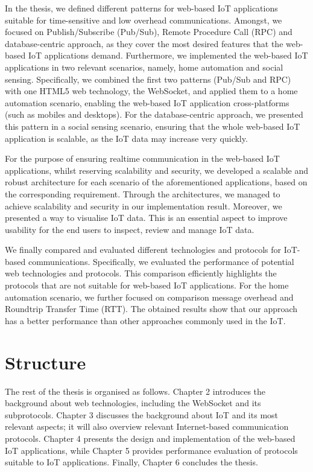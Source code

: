 In the thesis, we defined different patterns for web-based IoT applications suitable for time-sensitive and low overhead communications. Amongst, we focused on Publish/Subscribe (Pub/Sub), Remote Procedure Call (RPC) and database-centric approach, as they cover the most desired features that the web-based IoT applications demand. Furthermore, we implemented the web-based IoT applications in two relevant scenarios, namely, home automation and social sensing. Specifically, we combined the first two patterns (Pub/Sub and RPC) with one HTML5 web technology, the WebSocket, and applied them to a home automation scenario, enabling the web-based IoT application cross-platforms (such as mobiles and desktops). For the database-centric approach, we presented this pattern in a social sensing scenario, ensuring that the whole web-based IoT application is scalable, as the IoT data may increase very quickly.

For the purpose of ensuring realtime communication in the web-based IoT applications, whilst reserving scalability and security, we developed a scalable and robust architecture for each scenario of the aforementioned applications, based on the corresponding requirement. Through the architectures, we managed to achieve scalability and security in our implementation result. Moreover, we presented a way to visualise IoT data. This is an essential aspect to improve usability for the end users to inspect, review and manage IoT data.

We finally compared and evaluated different technologies and protocols for IoT-based communications. Specifically, we evaluated the performance of potential web technologies and protocols. This comparison efficiently highlights the protocols that are not suitable for web-based IoT applications. For the home automation scenario, we further focused on comparison message overhead and Roundtrip Transfer Time (RTT). The obtained results show that our approach has a better performance than other approaches commonly used in the IoT.

\section{Structure}

The rest of the thesis is organised as follows. Chapter 2 introduces the background about web technologies, including the WebSocket and its subprotocols. Chapter 3 discusses the background about IoT and its most relevant aspects; it will also overview relevant Internet-based communication protocols. Chapter 4 presents the design and implementation of the web-based IoT applications, while Chapter 5 provides performance evaluation of protocols suitable to IoT applications. Finally, Chapter 6 concludes the thesis. 